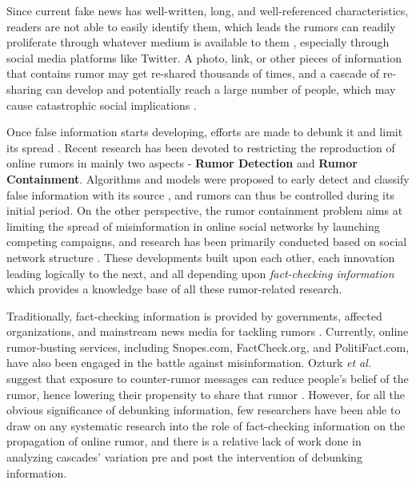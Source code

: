 \documentclass[conference]{IEEEtran}
\begin{document}
	Since current fake news has well-written, long, and well-referenced characteristics, readers are not able to easily identify them, which leads the rumors can readily proliferate through whatever medium is available to them \cite{vosoughi2018spread, kumar2016disinformation, shao2016hoaxy}, especially through social media platforms like Twitter. A photo, link, or other pieces of information that contains rumor may get re-shared thousands of times, and a cascade of re-sharing can develop and potentially reach a large number of people, which may cause catastrophic social implications \cite{friggeri2014rumor}. 
	
	Once false information starts developing, efforts are made to debunk it and limit its spread \cite{kumar2018false}. Recent research has been devoted to restricting the reproduction of online rumors in mainly two aspects - \textbf{Rumor Detection} and \textbf{Rumor Containment}. Algorithms and models were proposed to early detect and classify false information with its source \cite{kwon2013prominent, ma2016detecting, perez2017automatic}, and rumors can thus be controlled during its initial period. On the other perspective, the rumor containment problem aims at limiting the spread of misinformation in online social networks by launching competing campaigns, and research has been primarily conducted based on social network structure \cite{nguyen2012containment, tong2017efficient, tong2018misinformation}. These developments built upon each other, each innovation leading logically to the next, and all depending upon \textit{fact-checking information} which provides a knowledge base of all these rumor-related research. 
	
	Traditionally, fact-checking information is provided by governments, affected organizations, and mainstream news media for tackling rumors \cite{martens2018digital}. Currently, online rumor-busting services, including Snopes.com, FactCheck.org, and PolitiFact.com, have also been engaged in the battle against misinformation. Ozturk \textit{et al.} suggest that exposure to counter-rumor messages can reduce people’s belief of the rumor, hence lowering their propensity to share that rumor \cite{ozturk2015combating}. However, for all the obvious significance of debunking information, few researchers have been able to draw on any systematic research into the role of fact-checking information on the propagation of online rumor, and there is a relative lack of work done in analyzing cascades' variation pre and post the intervention of debunking information. 
	
\end{document}
